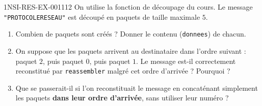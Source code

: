 \begin{exercice}{1NSI-RES-EX-001}{1}{12}
On utilise la fonction de découpage du cours. Le message \lstinline{"PROTOCOLERESEAU"} est
découpé en paquets de taille maximale $5$.
\begin{enumerate}
  \item Combien de paquets sont créés ? Donner le contenu (\lstinline{donnees}) de chacun.
  \item On suppose que les paquets arrivent au destinataire dans l'ordre suivant : paquet $2$, puis paquet $0$, puis paquet $1$. Le message est-il correctement reconstitué par \lstinline{reassembler} malgré cet ordre d'arrivée ? Pourquoi ?
  \item Que se passerait-il si l'on reconstituait le message en concaténant simplement les paquets \textbf{dans leur ordre d'arrivée}, sans utiliser leur numéro ?
\end{enumerate}
\end{exercice}
